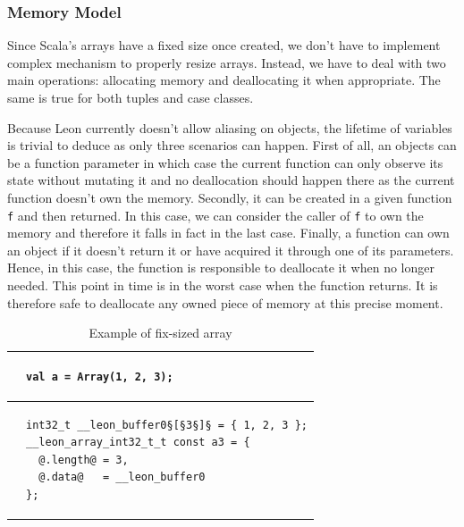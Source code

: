 \documentclass{article}
\newcommand{\inlineScala}[1]{\lstinline[language=MyScala]|#1|}
\newcommand{\vheading}[1]{\rotatebox[origin=c]{90}{~\textbf{#1}~}}
\begin{document}
\subsubsection{Memory Model}
\label{sec:memory-limitations}

Since Scala's arrays have a fixed size once created, we don't have to implement
complex mechanism to properly resize arrays. Instead, we have to deal with two
main operations: allocating memory and deallocating it when appropriate. The
same is true for both tuples and case classes.

Because Leon currently doesn't allow aliasing on objects, the lifetime of
variables is trivial to deduce as only three scenarios can happen. First of all,
an objects can be a function parameter in which case the current function can
only observe its state without mutating it and no deallocation should happen
there as the current function doesn't own the memory. Secondly, it can be
created in a given function \inlineScala{f} and then returned. In this case, we
can consider the caller of \inlineScala{f} to own the memory and therefore it
falls in fact in the last case. Finally, a function can own an object if it
doesn't return it or have acquired it through one of its parameters. Hence, in
this case, the function is responsible to deallocate it when no longer needed.
This point in time is in the worst case when the function returns. It is
therefore safe to deallocate any owned piece of memory at this precise moment.

\begin{table}[b]
  \centering
  \begin{tabular}{@{} c || l}
    \toprule

    \vheading{Scala} &
    \begin{lstlisting}[language=MyScala]
val a = Array(1, 2, 3);
    \end{lstlisting} \\

    \midrule

    \vheading{C99} &
    \begin{lstlisting}[language=C99]
int32_t __leon_buffer0§[§3§]§ = { 1, 2, 3 };
__leon_array_int32_t_t const a3 = {
  @.length@ = 3,
  @.data@   = __leon_buffer0
};
    \end{lstlisting} \\

    \bottomrule
  \end{tabular}
  \caption{Example of fix-sized array}
  \label{tab:fix-sized-array}
\end{table}
\end{document}
